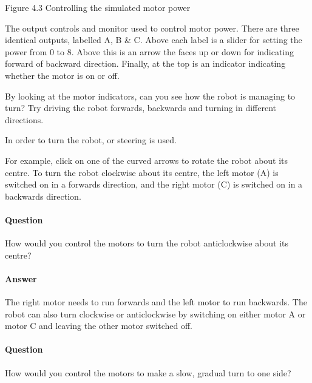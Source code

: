 \documentclass[letterpaper,10pt,english]{sphinxmanual}
\begin{document}

Figure 4.3 Controlling the simulated motor power

The output controls and monitor used to control motor power. There are three identical outputs, labelled A, B \& C. Above each label is a slider for setting the power from 0 to 8. Above this is an arrow the faces up or down for indicating forward of backward direction. Finally, at the top is an indicator indicating whether the motor is on or off.

By looking at the motor indicators, can you see how the robot is managing to turn? Try driving the robot forwards, backwards and turning in different directions.

In order to turn the robot,  or  steering is used.

For example, click on one of the curved arrows to rotate the robot about its centre. To turn the robot clockwise about its centre, the left motor (A) is switched on in a forwards direction, and the right motor (C) is switched on in a backwards direction.


\paragraph{Question}
\label{\detokenize{content/00_SOFTWARE_GUIDE/Section_00_04_LEGACY_UNUSED_IGNORE:Question}}
How would you control the motors to turn the robot anticlockwise about its centre?


\paragraph{Answer}
\label{\detokenize{content/00_SOFTWARE_GUIDE/Section_00_04_LEGACY_UNUSED_IGNORE:Answer}}
The right motor needs to run forwards and the left motor to run backwards. The robot can also turn clockwise or anticlockwise by switching on either motor A or motor C and leaving the other motor switched off.


\paragraph{Question}
\label{\detokenize{content/00_SOFTWARE_GUIDE/Section_00_04_LEGACY_UNUSED_IGNORE:id1}}
How would you control the motors to make a slow, gradual turn to one side?
\end{document}
